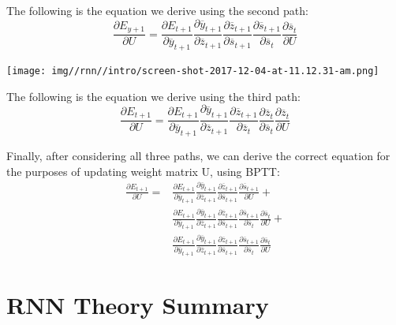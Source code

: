 The following is the equation we derive using the second path: \[\frac{\partial E_{y+1}}{\partial U} = \frac{\partial E_{t+1}}{\partial \overline{y}_{t+1}} \frac{\partial \overline{y}_{t+1}}{\partial \overline{z}_{t+1}} \frac{\partial \overline{z}_{t+1}}{\partial \overline{s}_{t+1}} \frac{\partial \overline{s}_{t+1}}{\partial \overline{s}_t} \frac{\partial \overline{s}_t}{\partial U}\]

\texttt{[image: img//rnn//intro/screen-shot-2017-12-04-at-11.12.31-am.png]}

The following is the equation we derive using the third path: \[\frac{\partial E_{t+1}}{\partial U} = \frac{\partial E_{t+1}}{\partial \overline{y}_{t+1}} \frac{\partial \overline{y}_{t+1}}{\partial \overline{z}_{t+1}} \frac{\partial \overline{z}_{t+1}}{\partial \overline{z}_{t}} \frac{\partial \overline{z}_{t}}{\partial \overline{s}_{t}} \frac{\partial \overline{z}_{t}}{\partial U}\]

Finally, after considering all three paths, we can derive the correct equation for the purposes of updating weight matrix U, using BPTT:
\begin{equation}
    \begin{split}
        \frac{\partial E_{t+1}}{\partial U} = & \frac{\partial E_{t+1}}{\partial \overline{y}_{t+1}} \frac{\partial \overline{y}_{t+1}}{\partial \overline{z}_{t+1}} \frac{\partial \overline{z}_{t+1}}{\partial \overline{s}_{t+1}} \frac{\partial \overline{s}_{t+1}}{\partial U} +\\
        & \frac{\partial E_{t+1}}{\partial \overline{y}_{t+1}} \frac{\partial \overline{y}_{t+1}}{\partial \overline{z}_{t+1}} \frac{\partial \overline{z}_{t+1}}{\partial \overline{s}_{t+1}} \frac{\partial \overline{s}_{t+1}}{\partial \overline{s}_t} \frac{\partial \overline{s}_t}{\partial U} +\\
        & \frac{\partial E_{t+1}}{\partial \overline{y}_{t+1}} \frac{\partial \overline{y}_{t+1}}{\partial \overline{z}_{t+1}} \frac{\partial \overline{z}_{t+1}}{\partial \overline{s}_{t+1}} \frac{\partial \overline{s}_{t+1}}{\partial \overline{s}_t} \frac{\partial \overline{s}_t}{\partial U}
    \end{split}
\end{equation}

\section{RNN Theory Summary}

